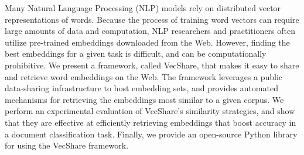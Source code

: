 Many Natural Language Processing (NLP) models rely on distributed vector representations of words.  Because the process of training word vectors can require large amounts of data and computation, NLP researchers and practitioners often utilize pre-trained embeddings downloaded from the Web. However, finding the best embeddings for a given task is difficult, and can be computationally prohibitive.  We present a framework, called VecShare, that makes it easy to share and retrieve word embeddings on the Web.  The framework leverages a public data-sharing infrastructure to host embedding sets, and provides automated mechanisms for retrieving the embeddings most similar to a given corpus.  We perform an experimental evaluation of VecShare's similarity strategies, and show that they are effective at efficiently retrieving embeddings that boost accuracy in a document classification task.  Finally, we provide an open-source Python library for using the VecShare framework.
